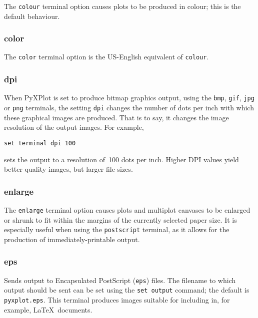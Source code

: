 The {\tt colour} terminal option causes plots to be produced in colour; this is
the default behaviour.


\subsubsection{color}

The {\tt color} terminal option is the US-English equivalent of {\tt colour}.


\subsubsection{dpi}

When PyXPlot is set to produce bitmap graphics output, using the {\tt bmp},
{\tt gif}, {\tt jpg} or {\tt png} terminals, the setting {\tt dpi} changes the
number of dots per inch with which these graphical images are produced. That is
to say, it changes the image resolution of the output images. For example,

\begin{verbatim}
set terminal dpi 100
\end{verbatim}

\noindent sets the output to a resolution of~100 dots per inch. Higher DPI
values yield better quality images, but larger file sizes.


\subsubsection{enlarge}

The {\tt enlarge} terminal option causes plots and multiplot canvases to be
enlarged or shrunk to fit within the margins of the currently selected paper
size. It is especially useful when using the {\tt postscript} terminal, as it
allows for the production of immediately-printable output.


\subsubsection{eps}

Sends output to Encapsulated PostScript ({\tt eps}) files.  The filename to
which output should be sent can be set using the {\tt set output} command; the
default is {\tt pyxplot.eps}.  This terminal produces images suitable for
including in, for example, \LaTeX\ documents.



